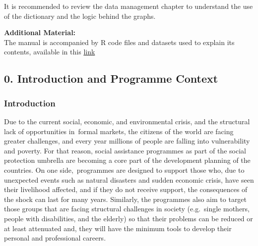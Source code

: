 \documentclass[
]{article}
\begin{document}
It is recommended to review the data management chapter to understand
the use of the dictionary and the logic behind the graphs.

\textbf{Additional Material:}\\
The manual is accompanied by R code files and datasets used to explain
its contents, available in this
\href{https://github.com/ESCWASP/SPP_RAF}{link}

\subsection{\texorpdfstring{\textbf{0. Introduction and Programme
Context}}{0. Introduction and Programme Context}}\label{introduction-and-programme-context}

\subsubsection{Introduction}\label{introduction}

Due to the current social, economic, and environmental crisis, and the
structural lack of opportunities in~formal markets, the citizens of the
world are facing greater challenges, and every year millions of people
are falling into vulnerability and poverty. For that reason, social
assistance programmes as part of the social protection umbrella are
becoming a core part of the development planning of the countries. On
one side,~programmes are designed to support those who, due to
unexpected events such as natural disasters and sudden economic crisis,
have seen their livelihood affected, and if they do not receive support,
the consequences of the shock can last for many years. Similarly, the
programmes also aim to target those groups that are facing structural
challenges in society (e.g.~single mothers, people with disabilities,
and the elderly) so that their problems can be reduced or at least
attenuated and, they will have the minimum tools to develop their
personal and professional careers.
\end{document}

